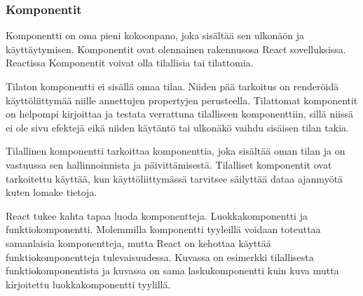 \subsubsection{Komponentit}











Komponentti on oma pieni kokoonpano, joka sisältää sen ulkonäön ja käyttäytymisen.
Komponentit ovat olennainen rakennusosa React sovelluksissa.
Reactissa Komponentit voivat olla tilallisia tai tilattomia. 
\medskip



Tilaton komponentti ei sisällä omaa tilaa. 
Niiden pää tarkoitus on renderöidä käyttöliittymää niille annettujen propertyjen perusteella.
Tilattomat komponentit on helpompi kirjoittaa ja testata verrattuna tilalliseen komponenttiin, 
sillä niissä ei ole sivu efektejä eikä niiden käytäntö tai ulkonäkö vaihdu sisäisen tilan takia.
\medskip


Tilallinen komponentti tarkoittaa komponenttia, 
joka sisältää oman tilan ja on vastuussa sen hallinnoinnista ja päivittämisestä.
Tilalliset komponentit ovat tarkoitettu käyttää, kun käyttöliittymässä tarvitsee säilyttää dataa ajanmyötä 
kuten lomake tietoja.\\
\medskip







React tukee kahta tapaa luoda komponentteja. Luokkakomponentti ja funktiokomponentti.
Molemmilla komponentti tyyleillä voidaan toteuttaa samanlaisia komponentteja, mutta React on kehottaa käyttää funktiokomponentteja tulevaisuudessa. 
Kuvassa \nextImageCount {} on esimerkki tilallisesta funktiokomponentista ja
kuvassa \nextnextImageCount {} on sama laskukomponentti kuin kuva \nextImageCount{} mutta kirjoitettu luokkakomponentti tyylillä. 
\medskip



